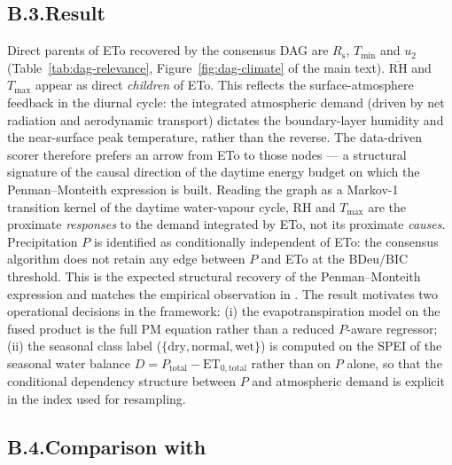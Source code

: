 \subsection*{B.3.\quad Result}

Direct parents of ETo recovered by the consensus DAG are
$R_{\mathrm{s}}$, $T_{\mathrm{min}}$ and $u_2$
(Table~\ref{tab:dag-relevance}, Figure~\ref{fig:dag-climate} of the
main text). $\overline{\mathrm{RH}}$ and $T_{\mathrm{max}}$ appear
as direct \emph{children} of ETo. This reflects the
surface-atmosphere feedback in the diurnal cycle: the integrated
atmospheric demand (driven by net radiation and aerodynamic transport)
dictates the boundary-layer humidity and the near-surface peak
temperature, rather than the reverse. The data-driven scorer
therefore prefers an arrow from ETo to those nodes — a structural
signature of the causal direction of the daytime energy budget on
which the Penman--Monteith expression is built. Reading the graph as
a Markov-1 transition kernel of the daytime water-vapour cycle, RH
and $T_\mathrm{max}$ are the proximate \emph{responses} to the
demand integrated by ETo, not its proximate \emph{causes}. Precipitation $P$ is identified as conditionally
independent of ETo: the consensus algorithm does not retain any
edge between $P$ and ETo at the BDeu/BIC threshold. This is the
expected structural recovery of the Penman--Monteith expression and
matches the empirical observation in
\citet{Ribeiro2024}. The result motivates two operational
decisions in the framework: (i) the evapotranspiration model on the
fused product is the full PM equation rather than a reduced
$P$-aware regressor; (ii) the seasonal class label
($\{\mathrm{dry}, \mathrm{normal}, \mathrm{wet}\}$) is computed on
the SPEI of the seasonal water balance $D = P_{\mathrm{total}} -
\mathrm{ET}_{0,\mathrm{total}}$ rather than on $P$ alone, so that
the conditional dependency structure between $P$ and atmospheric
demand is explicit in the index used for resampling.

\subsection*{B.4.\quad Comparison with \citet{Ribeiro2022}}

